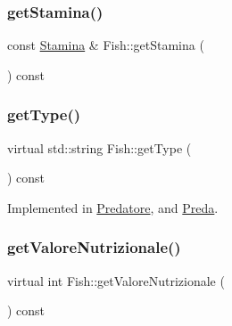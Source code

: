 \mbox{\label{classFish_a8637a567ecb17376bed45783d5ddb53d_a8637a567ecb17376bed45783d5ddb53d}} 
\subsubsection{\texorpdfstring{get\+Stamina()}{getStamina()}}
{\footnotesize\ttfamily const \hyperlink{classStamina}{Stamina} \& Fish\+::get\+Stamina (\begin{DoxyParamCaption}{ }\end{DoxyParamCaption}) const}

\mbox{\label{classFish_adb00fb6bac2fad27660107c12d1a7fa2_adb00fb6bac2fad27660107c12d1a7fa2}} 
\subsubsection{\texorpdfstring{get\+Type()}{getType()}}
{\footnotesize\ttfamily virtual std\+::string Fish\+::get\+Type (\begin{DoxyParamCaption}{ }\end{DoxyParamCaption}) const\hspace{0.3cm}{\ttfamily [pure virtual]}}



Implemented in \hyperlink{classPredatore_ae88add4104d54d5973b87d76f796a97c_ae88add4104d54d5973b87d76f796a97c}{Predatore}, and \hyperlink{classPreda_a0acc2147813c125f3fdd7b0743d62b81_a0acc2147813c125f3fdd7b0743d62b81}{Preda}.

\mbox{\label{classFish_a97dd71f31af1e36a630944c5c5b8ff33_a97dd71f31af1e36a630944c5c5b8ff33}} 
\subsubsection{\texorpdfstring{get\+Valore\+Nutrizionale()}{getValoreNutrizionale()}}
{\footnotesize\ttfamily virtual int Fish\+::get\+Valore\+Nutrizionale (\begin{DoxyParamCaption}{ }\end{DoxyParamCaption}) const\hspace{0.3cm}{\ttfamily [pure virtual]}}



